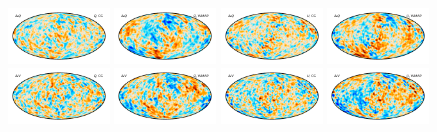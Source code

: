 \documentclass[twocolumn]{../../common/aa}
\begin{document}
\begin{figure}

	\centering
	\includegraphics[width=0.24\textwidth]{figures/Q_deltaQ.pdf}
	\includegraphics[width=0.24\textwidth]{figures/Q_W_deltaQ.pdf}
	\includegraphics[width=0.24\textwidth]{figures/Q_deltaU.pdf}
	\includegraphics[width=0.24\textwidth]{figures/Q_W_deltaU.pdf}\\
	\includegraphics[width=0.24\textwidth]{figures/V_deltaQ.pdf}
	\includegraphics[width=0.24\textwidth]{figures/V_W_deltaQ.pdf}
	\includegraphics[width=0.24\textwidth]{figures/V_deltaU.pdf}
	\includegraphics[width=0.24\textwidth]{figures/V_W_deltaU.pdf}\\

\end{figure}
\end{document}
